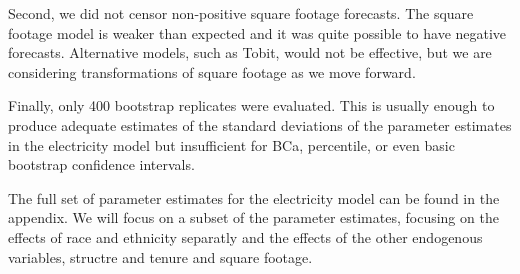 \documentclass{article}
\begin{document}
Second, we did not censor non-positive square footage forecasts.  The square footage model is weaker than expected and it was quite possible to have negative forecasts.  Alternative models, such as Tobit, would not be effective, but we are considering transformations of square footage as we move forward.  

Finally, only 400 bootstrap replicates were evaluated.  This is usually enough to produce adequate estimates of the standard deviations of the parameter estimates in the electricity model but insufficient for BCa, percentile, or even basic bootstrap confidence intervals. 





The full set of parameter estimates for the electricity model can be found in the appendix.  We will focus on a subset of the parameter estimates, focusing on the effects of race and ethnicity separatly and the effects of the other endogenous variables, structre and tenure and square footage.
\end{document}
